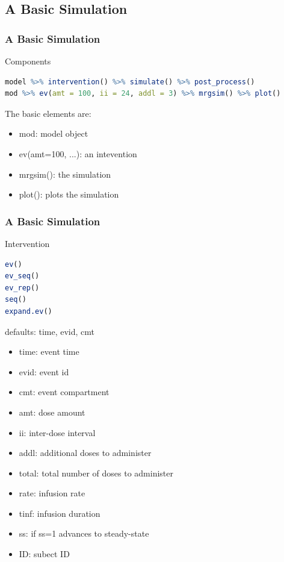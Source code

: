 \documentclass[
	11pt, %
]{beamer}
\begin{document}


\subsection{A Basic Simulation}
\begin{frame}[fragile]{}
	\frametitle{A Basic Simulation}
	\begin{block}{Components}
\begin{lstlisting}[language=R] 
model %>% intervention() %>% simulate() %>% post_process()
mod %>% ev(amt = 100, ii = 24, addl = 3) %>% mrgsim() %>% plot()
\end{lstlisting}
The basic elements are:
     \begin{itemize}
     \item \textcolor{codepurple}{mod}: model object
     \item \textcolor{codepurple}{ev(amt=100, ...)}: an intevention
     \item \textcolor{codepurple}{mrgsim()}: the simulation
     \item \textcolor{codepurple}{plot()}: plots the simulation
     \end{itemize}

    \end{block}
    
\end{frame}




\begin{frame}[fragile]{}
	\frametitle{A Basic Simulation}
	\begin{block}{Intervention}
\begin{lstlisting}[language=R]
ev()
ev_seq()
ev_rep()
seq()
expand.ev()
\end{lstlisting}
defaults: time, evid, cmt
\tiny
     \begin{itemize}
     \item \textcolor{codegreen}{time}: event time
     \item \textcolor{codegreen}{evid}: event id
     \item \textcolor{codegreen}{cmt}: event compartment
     \item \textcolor{codegreen}{amt}: dose amount
     \item \textcolor{codegreen}{ii}: inter-dose interval
     \item \textcolor{codegreen}{addl}: additional doses to administer
     \item \textcolor{codegreen}{total}: total number of doses to administer
     \item \textcolor{codegreen}{rate}: infusion rate
     \item \textcolor{codegreen}{tinf}: infusion duration
     \item \textcolor{codegreen}{ss}: if ss=1 advances to steady-state
     \item \textcolor{codegreen}{ID}: subect ID
     \end{itemize}
    \end{block}
    
\end{frame}
\end{document}
